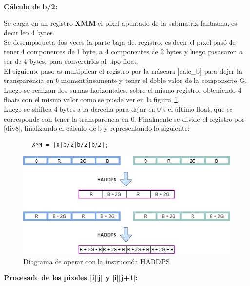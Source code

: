 {\centering\textbf{Cálculo de b/2:}}

Se carga en un registro \textbf{XMM} el pixel apuntado de la submatriz fantasma, es decir leo 4 bytes. \\
Se desempaqueta dos veces la parte baja del registro, es decir el pixel pasó de tener 4 componentes de 1 byte, a 4 componentes de 2 bytes y luego pasasaron a ser de 4 bytes, para convertirlos al tipo float. \\
El siguiente paso es multiplicar el registro por la máscara [calc\_b] para dejar la transparencia en 0 momentáneamente y tener el doble valor de la componente G. \\
Luego se realizan dos sumas horizontales, sobre el mismo registro, obteniendo 4 floats con el mismo valor como se puede ver en la figura~\ref{sumah}. \\
Luego se shiftea 4 bytes a la derecha para dejar en 0's el último float, que se corresponde con tener la transparencia en 0.
Finalmente se divide el registro por [div8], finalizando el cálculo de b y representando lo siguiente:
\begin{codesnippet}
\begin{verbatim}
        XMM = |0|b/2|b/2|b/2|;
\end{verbatim}
\end{codesnippet}

\begin{figure}[h]
  \begin{center}
	\includegraphics[scale=0.5]{img/haddps.jpg}
	\caption{Diagrama de operar con la instrucción HADDPS}
	\label{sumah}
  \end{center}
\end{figure}

{\centering\textbf{Procesado de los pixeles [i][j] y [i][j+1]:}}


